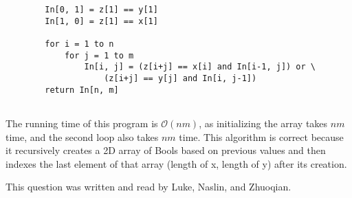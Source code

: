\documentclass[12pt]{article}
\begin{document}
\begin{enumerate}
\begin{verbatim}
        In[0, 1] = z[1] == y[1]
        In[1, 0] = z[1] == x[1]
        
        for i = 1 to n
            for j = 1 to m
                In[i, j] = (z[i+j] == x[i] and In[i-1, j]) or \
                    (z[i+j] == y[j] and In[i, j-1])
        return In[n, m]
            
    \end{verbatim}
    The running time of this program is $\mathcal{O}(nm)$, as initializing the array takes $nm$ time, and the second loop also takes $nm$ time. This algorithm is correct because it recursively creates a 2D array of Bools based on previous values and then indexes the last element of that array (length of x, length of y) after its creation. 

    This question was written and read by  Luke, Naslin, and Zhuoqian.
\end{enumerate}
\end{document}

